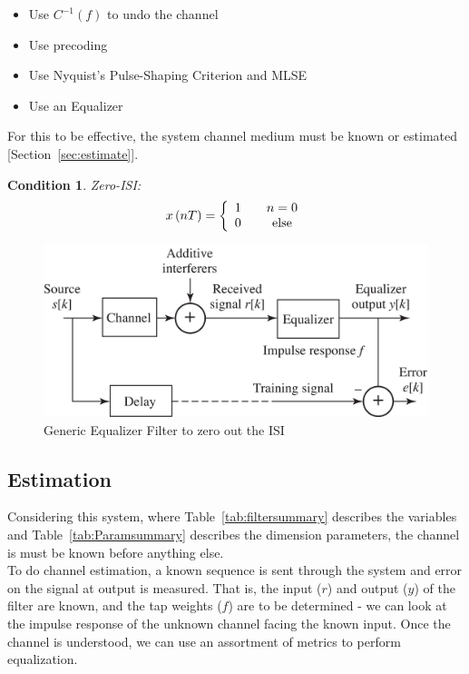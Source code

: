\documentclass[]{article}
\newtheorem{thm}{Condition}
\begin{document}
\begin{itemize}
\item Use $C^{-1}\left(f\right)$ to undo the channel
\item Use precoding
\item Use Nyquist's Pulse-Shaping Criterion and MLSE
\item Use an Equalizer
\end{itemize}

For this to be effective, the system channel medium must be known or estimated [Section~\ref{sec:estimate}].\\

\begin{thm}
\label{thm:zero}
Zero-ISI:
$$x\left(nT\right) = \left\{
\begin{array}{c c}
1 & \quad n=0 \\
0 & \quad \text{else}
\end{array} \right.$$
\end{thm}

\begin{figure}[b]
\centering
\includegraphics[width=.6\textwidth]{equalizer.png}
\caption{Generic Equalizer Filter to zero out the ISI\label{fig:equalizer}}
\end{figure}

\subsection{Estimation}
\label{app:estimate}
Considering this system, where Table~\ref{tab:filtersummary} describes the variables and Table~\ref{tab:Paramsummary} describes the dimension parameters, the channel is must be known before anything else. \\

To do channel estimation, a known sequence is sent through the system and error on the signal at output is measured.  That is, the input ($r$) and output ($y$) of the filter are known, and the tap weights ($f$) are to be determined - we can look at the impulse response of the unknown channel facing the known input.  Once the channel is understood, we can use an assortment of metrics to perform equalization.
\end{document}
